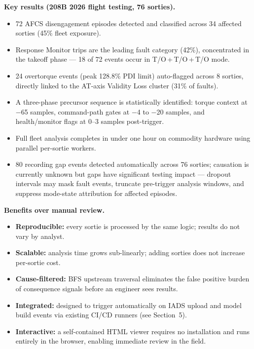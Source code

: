 \documentclass[11pt, letterpaper]{article}
\begin{document}
\medskip
\noindent\textbf{Key results (208B 2026 flight testing, 76 sorties).}
\begin{itemize}[leftmargin=1.6em, itemsep=2pt, topsep=4pt]
  \item 72 AFCS disengagement episodes detected and classified across 34
    affected sorties (45\% fleet exposure).
  \item Response Monitor trips are the leading fault category (42\%),
    concentrated in the takeoff phase --- 18 of 72 events occur in
    T/O\,+\,T/O\,+\,T/O mode.
  \item 24 overtorque events (peak 128.8\% PDI limit) auto-flagged across 8
    sorties, directly linked to the AT-axis Validity Loss cluster (31\% of
    faults).
  \item A three-phase precursor sequence is statistically identified:
    torque context at $-$65 samples, command-path gates at $-$4 to $-$20
    samples, and health/monitor flags at 0--3 samples post-trigger.
  \item Full fleet analysis completes in under one hour on commodity hardware
    using parallel per-sortie workers.
  \item 80 recording gap events detected automatically across 76 sorties;
    causation is currently unknown but gaps have significant testing impact ---
    dropout intervals may mask fault events, truncate pre-trigger analysis
    windows, and suppress mode-state attribution for affected episodes.
\end{itemize}

\medskip
\noindent\textbf{Benefits over manual review.}
\begin{itemize}[leftmargin=1.6em, itemsep=2pt, topsep=4pt]
  \item \textbf{Reproducible:} every sortie is processed by the same logic;
    results do not vary by analyst.
  \item \textbf{Scalable:} analysis time grows sub-linearly; adding sorties
    does not increase per-sortie cost.
  \item \textbf{Cause-filtered:} BFS upstream traversal eliminates the false
    positive burden of consequence signals before an engineer sees results.
  \item \textbf{Integrated:} designed to trigger automatically on IADS upload
    and model build events via existing CI/CD runners (see Section~5).
  \item \textbf{Interactive:} a self-contained HTML viewer requires no
    installation and runs entirely in the browser, enabling immediate
    review in the field.
\end{itemize}
\end{document}

